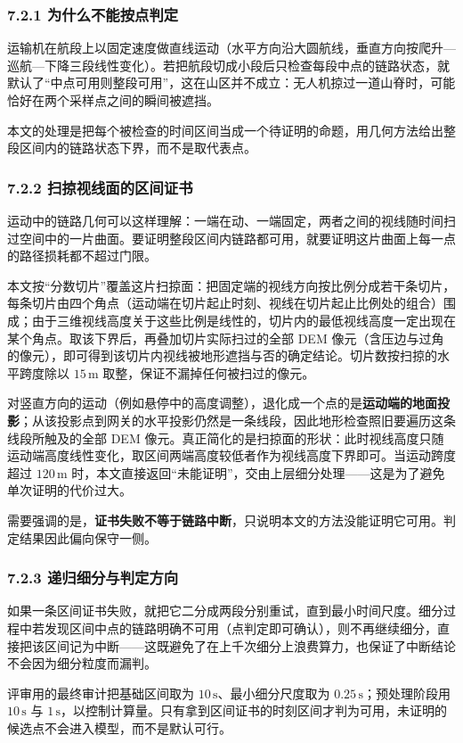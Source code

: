 \documentclass[withoutpreface,bwprint]{format}
\begin{document}
\subsubsection{7.2.1 为什么不能按点判定}
运输机在航段上以固定速度做直线运动（水平方向沿大圆航线，垂直方向按爬升—巡航—下降三段线性变化）。若把航段切成小段后只检查每段中点的链路状态，就默认了“中点可用则整段可用”，这在山区并不成立：无人机掠过一道山脊时，可能恰好在两个采样点之间的瞬间被遮挡。

本文的处理是把每个被检查的时间区间当成一个待证明的命题，用几何方法给出整段区间内的链路状态下界，而不是取代表点。

\subsubsection{7.2.2 扫掠视线面的区间证书}
运动中的链路几何可以这样理解：一端在动、一端固定，两者之间的视线随时间扫过空间中的一片曲面。要证明整段区间内链路都可用，就要证明这片曲面上每一点的路径损耗都不超过门限。

本文按“分数切片”覆盖这片扫掠面：把固定端的视线方向按比例分成若干条切片，每条切片由四个角点（运动端在切片起止时刻、视线在切片起止比例处的组合）围成；由于三维视线高度关于这些比例是线性的，切片内的最低视线高度一定出现在某个角点。取该下界后，再叠加切片实际扫过的全部 DEM 像元（含压边与过角的像元），即可得到该切片内视线被地形遮挡与否的确定结论。切片数按扫掠的水平跨度除以 $15\,\text{m}$ 取整，保证不漏掉任何被扫过的像元。

对竖直方向的运动（例如悬停中的高度调整），退化成一个点的是\textbf{运动端的地面投影}；从该投影点到网关的水平投影仍然是一条线段，因此地形检查照旧要遍历这条线段所触及的全部 DEM 像元。真正简化的是扫掠面的形状：此时视线高度只随运动端高度线性变化，取区间两端高度较低者作为视线高度下界即可。当运动跨度超过 $120\,\text{m}$ 时，本文直接返回“未能证明”，交由上层细分处理——这是为了避免单次证明的代价过大。

需要强调的是，\textbf{证书失败不等于链路中断}，只说明本文的方法没能证明它可用。判定结果因此偏向保守一侧。

\subsubsection{7.2.3 递归细分与判定方向}
如果一条区间证书失败，就把它二分成两段分别重试，直到最小时间尺度。细分过程中若发现区间中点的链路明确不可用（点判定即可确认），则不再继续细分，直接把该区间记为中断——这既避免了在上千次细分上浪费算力，也保证了中断结论不会因为细分粒度而漏判。

评审用的最终审计把基础区间取为 $10\,\text{s}$、最小细分尺度取为 $0.25\,\text{s}$；预处理阶段用 $10\,\text{s}$ 与 $1\,\text{s}$，以控制计算量。只有拿到区间证书的时刻区间才判为可用，未证明的候选点不会进入模型，而不是默认可行。
\end{document}
